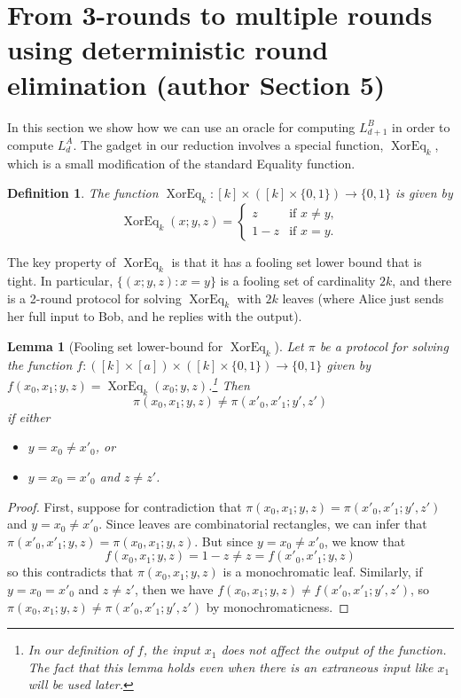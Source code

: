\documentclass[10pt,a4paper]{article}
\newtheorem{lemma}[theorem]{Lemma}
\newtheorem{definition}[theorem]{Definition}
\newcommand{\XorEq}{\operatorname{XorEq}}
\begin{document}
\section*{From 3-rounds to multiple rounds using deterministic round elimination (author Section 5)}
In this section we show how we can use an oracle for computing $L_{d+1}^B$ in order to compute $L_d^A$. The gadget in our reduction involves a special function, $\XorEq_k$, which is a small modification of the standard Equality function.
\begin{definition}
The function $\XorEq_k:[k]\times([k]\times\{0,1\})\to\{0,1\}$ is given by
\[\XorEq_k(x;y,z)=\begin{cases}z&\text{if }x\ne y,\\1-z&\text{if }x=y.\end{cases}\]
\end{definition}
The key property of $\XorEq_k$ is that it has a fooling set lower bound that is tight. In particular, $\{(x;y,z):x=y\}$ is a fooling set of cardinality $2k$, and there is a 2-round protocol for solving $\XorEq_k$ with $2k$ leaves (where Alice just sends her full input to Bob, and he replies with the output).
\begin{lemma}[Fooling set lower-bound for $\XorEq_k$]\label{lem:fooling}
Let $\pi$ be a protocol for solving the function $f:([k]\times[a])\times([k]\times\{0,1\})\to\{0,1\}$ given by $f(x_0,x_1;y,z)=\XorEq_k(x_0;y,z)$.\footnote{In our definition of $f$, the input $x_1$ does not affect the output of the function. The fact that this lemma holds even when there is an extraneous input like $x_1$ will be used later.} Then
\[\pi(x_0,x_1;y,z)\ne\pi(x'_0,x'_1;y',z')\]
if either
\begin{itemize}
\item $y=x_0\ne x'_0$, or
\item $y=x_0=x'_0$ and $z\ne z'$.
\end{itemize}
\end{lemma}
\begin{proof}
First, suppose for contradiction that $\pi(x_0,x_1;y,z)=\pi(x'_0,x'_1;y',z')$ and $y=x_0\ne x'_0$. Since leaves are combinatorial rectangles, we can infer that $\pi(x'_0,x'_1;y,z)=\pi(x_0,x_1;y,z)$. But since $y=x_0\ne x'_0$, we know that
\[f(x_0,x_1;y,z)=1-z\ne z=f(x'_0,x'_1;y,z)\]
so this contradicts that $\pi(x_0,x_1;y,z)$ is a monochromatic leaf.
Similarly, if $y=x_0=x'_0$ and $z\ne z'$, then we have $f(x_0,x_1;y,z)\ne f(x'_0,x'_1;y',z')$, so $\pi(x_0,x_1;y,z)\ne\pi(x'_0,x'_1;y',z')$ by monochromaticness.
\end{proof}
\end{document}
